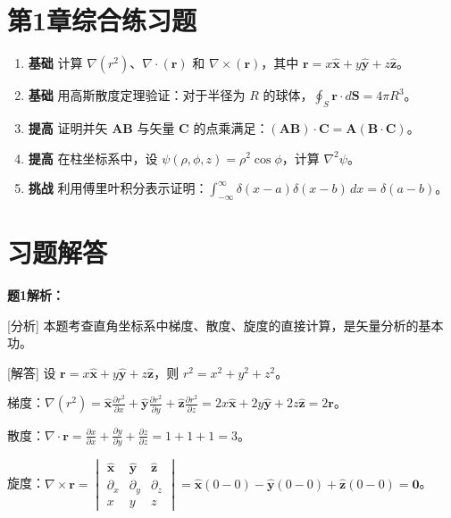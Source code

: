 \documentclass[11pt,a4paper,openany,oneside]{book}
\newcommand{\vect}[1]{\bm{#1}}
\newcommand{\unitvec}[1]{\hat{\vect{#1}}}
\newcommand{\grad}{\nabla}
\newcommand{\curl}{\nabla\times}
\newcommand{\divg}{\nabla\cdot}
\newcommand{\lap}{\nabla^2}
\begin{document}
\section*{第1章综合练习题}
\begin{enumerate}[label=\textbf{\arabic*.}]
\item \textbf{基础} 计算 $\grad(r^2)$、$\divg(\vect{r})$ 和 $\curl(\vect{r})$，其中 $\vect{r}=x\unitvec{x}+y\unitvec{y}+z\unitvec{z}$。
\item \textbf{基础} 用高斯散度定理验证：对于半径为 $R$ 的球体，$\oint_S \vect{r}\cdot d\vect{S}=4\pi R^3$。
\item \textbf{提高} 证明并矢 $\bm{A}\bm{B}$ 与矢量 $\bm{C}$ 的点乘满足：$(\bm{A}\bm{B})\cdot\bm{C}=\bm{A}(\bm{B}\cdot\bm{C})$。
\item \textbf{提高} 在柱坐标系中，设 $\psi(\rho,\phi,z)=\rho^2\cos\phi$，计算 $\lap\psi$。
\item \textbf{挑战} 利用傅里叶积分表示证明：$\int_{-\infty}^{\infty} \delta(x-a)\delta(x-b)\,dx = \delta(a-b)$。
\end{enumerate}
\newpage
\section*{习题解答}

\textbf{题1解析：}

[分析] 本题考查直角坐标系中梯度、散度、旋度的直接计算，是矢量分析的基本功。

[解答] 设 $\vect{r} = x\unitvec{x} + y\unitvec{y} + z\unitvec{z}$，则 $r^2 = x^2 + y^2 + z^2$。

梯度：$\grad(r^2) = \unitvec{x}\frac{\partial r^2}{\partial x} + \unitvec{y}\frac{\partial r^2}{\partial y} + \unitvec{z}\frac{\partial r^2}{\partial z} = 2x\unitvec{x} + 2y\unitvec{y} + 2z\unitvec{z} = 2\vect{r}$。

散度：$\divg\vect{r} = \frac{\partial x}{\partial x} + \frac{\partial y}{\partial y} + \frac{\partial z}{\partial z} = 1 + 1 + 1 = 3$。

旋度：$\curl\vect{r} = \begin{vmatrix}\unitvec{x} & \unitvec{y} & \unitvec{z} \\ \partial_x & \partial_y & \partial_z \\ x & y & z\end{vmatrix} = \unitvec{x}(0-0) - \unitvec{y}(0-0) + \unitvec{z}(0-0) = \vect{0}$。
\end{document}
